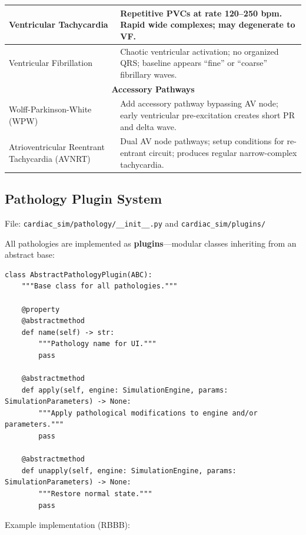 \documentclass[12pt,a4paper,oneside]{book}
\begin{document}
\begin{center}
\begin{longtable}{|l|p{5cm}|}
\hline
Ventricular Tachycardia & Repetitive PVCs at rate 120–250 bpm. Rapid wide complexes; may degenerate to VF. \\
\hline
Ventricular Fibrillation & Chaotic ventricular activation; no organized QRS; baseline appears ``fine'' or ``coarse'' fibrillary waves. \\
\hline
\multicolumn{2}{|c|}{\textbf{Accessory Pathways}} \\
\hline
Wolff-Parkinson-White (WPW) & Add accessory pathway bypassing AV node; early ventricular pre-excitation creates short PR and delta wave. \\
\hline
Atrioventricular Reentrant Tachycardia (AVNRT) & Dual AV node pathways; setup conditions for re-entrant circuit; produces regular narrow-complex tachycardia. \\
\hline

\end{longtable}
\end{center}

\subsection{Pathology Plugin System}

File: \texttt{cardiac\_sim/pathology/\_\_init\_\_.py} and \texttt{cardiac\_sim/plugins/}

All pathologies are implemented as \textbf{plugins}---modular classes inheriting from an abstract base:

\begin{Verbatim}[formatcom=\color{black}]
class AbstractPathologyPlugin(ABC):
    """Base class for all pathologies."""
    
    @property
    @abstractmethod
    def name(self) -> str:
        """Pathology name for UI."""
        pass
    
    @abstractmethod
    def apply(self, engine: SimulationEngine, params: SimulationParameters) -> None:
        """Apply pathological modifications to engine and/or parameters."""
        pass
    
    @abstractmethod
    def unapply(self, engine: SimulationEngine, params: SimulationParameters) -> None:
        """Restore normal state."""
        pass
\end{Verbatim}

Example implementation (RBBB):
\end{document}
